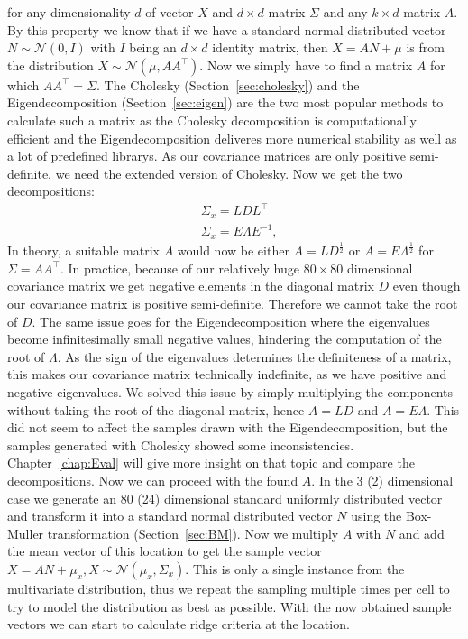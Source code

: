 \noindent for any dimensionality $d$ of vector $X$ and $d \times d$
matrix $\Sigma$ and any $k \times d$ matrix $A$. By this property we
know that if we have a standard normal distributed vector $N \sim
\mathcal{N}(0,I)$ with $I$ being an $d \times d$ identity matrix, then
$X = AN + \mu$ is from the distribution $X \sim \mathcal{N}(\mu, A
A^\top)$. Now we simply have to find a matrix $A$ for which $AA^\top =
\Sigma$. The Cholesky (Section~\ref{sec:cholesky}) and the
Eigendecomposition (Section~\ref{sec:eigen}) are the two most popular
methods to calculate such a matrix as the Cholesky decomposition is
computationally efficient and the Eigendecomposition deliveres more
numerical stability as well as a lot of predefined librarys. As our
covariance matrices are only positive semi-definite, we need the
extended version of Cholesky. Now we get the two decompositions:
\begin{align}
    &\Sigma_x = L D L^\top \\
    &\Sigma_x = E \Lambda E^{-1},
\end{align}
In theory, a suitable matrix $A$ would now be either $A=L
D^{\frac{1}{2}}$ or $A=E\Lambda^{\frac{1}{2}}$ for $\Sigma = AA^\top$.
In practice, because of our relatively huge $80 \times 80$ dimensional
covariance matrix we get negative elements in the diagonal matrix $D$
even though our covariance matrix is positive semi-definite. Therefore
we cannot take the root of $D$. The same issue goes for the
Eigendecomposition where the eigenvalues become infinitesimally small
negative values, hindering the computation of the root of $\Lambda$. As
the sign of the eigenvalues determines the definiteness of a matrix,
this makes our covariance matrix technically indefinite, as we have
positive and negative eigenvalues. We solved this issue by simply
multiplying the components without taking the root of the diagonal
matrix, hence $A = LD$ and $A = E \Lambda$. This did not seem to affect
the samples drawn with the Eigendecomposition, but the samples generated
with Cholesky showed some inconsistencies. Chapter~\ref{chap:Eval} will
give more insight on that topic and compare the decompositions. Now we
can proceed with the found $A$. In the 3 (2) dimensional  case we
generate an 80 (24) dimensional standard uniformly distributed vector
and transform it into a standard normal distributed vector $N$ using the
Box-Muller transformation (Section~\ref{sec:BM}). Now we multiply $A$
with $N$ and add the mean vector of this location to get the sample
vector $X = AN + \mu_x, X \sim \mathcal{N}(\mu_x, \Sigma_x)$. This is
only a single instance from the multivariate distribution, thus we
repeat the sampling multiple times per cell to try to model the
distribution as best as possible. With the now obtained sample vectors
we can start to calculate ridge criteria at the location.

